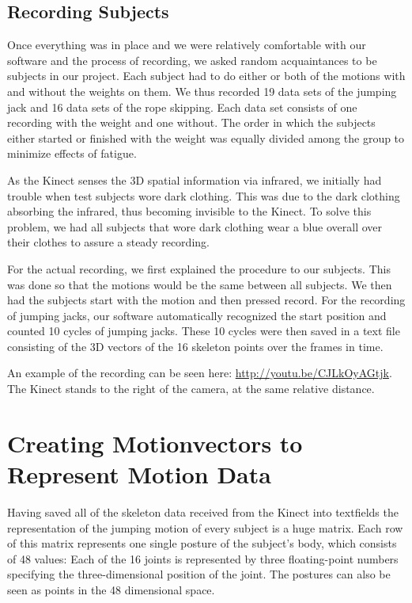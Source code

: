 \documentclass[a4paper]{article}
\begin{document}
\subsection{Recording Subjects}

Once everything was in place and we were relatively comfortable with our software and the process of recording, we asked random acquaintances to be subjects in our project.
Each subject had to do either or both of the motions with and without the weights on them.
We thus recorded 19 data sets of the jumping jack and 16 data sets of the rope skipping.
Each data set consists of one recording with the weight and one without.
The order in which the subjects either started or finished with the weight was equally divided among the group to minimize effects of fatigue.

As the Kinect senses the 3D spatial information via infrared, we initially had trouble when test subjects wore dark clothing.
This was due to the dark clothing absorbing the infrared, thus becoming invisible to the Kinect.
To solve this problem, we had all subjects that wore dark clothing wear a blue overall over their clothes to assure a steady recording.

For the actual recording, we first explained the procedure to our subjects.
This was done so that the motions would be the same between all subjects.
We then had the subjects start with the motion and then pressed record.
For the recording of jumping jacks, our software automatically recognized the start position and counted 10 cycles of jumping jacks.
These 10 cycles were then saved in a text file consisting of the 3D vectors of the 16 skeleton points over the frames in time.

An example of the recording can be seen here: \url{http://youtu.be/CJLkOyAGtjk}. The Kinect stands to the right of the camera, at the same relative distance.

\section{Creating Motionvectors to Represent Motion Data}

Having saved all of the skeleton data received from the Kinect into textfields the representation of the jumping motion of every subject is a huge matrix. Each row of this matrix represents one single posture of the subject's body, which consists of 48 values:
Each of the 16 joints is represented by three floating-point numbers specifying the three-dimensional position of the joint.
The postures can also be seen as points in the 48 dimensional space.
\end{document}
